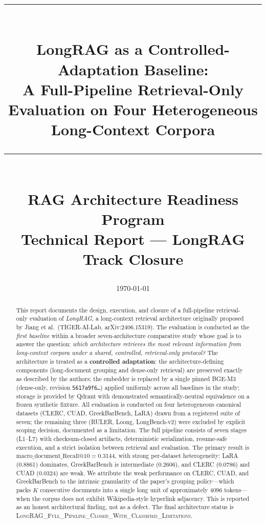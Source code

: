 \documentclass[11pt,a4paper]{article}
\title{
  \vspace{-1.5cm}
  \rule{\linewidth}{0.4pt}\\[0.3cm]
  {\Large\bfseries LongRAG as a Controlled-Adaptation Baseline:}\\[0.15cm]
  {\large A Full-Pipeline Retrieval-Only Evaluation on Four Heterogeneous\\ Long-Context Corpora}\\[0.2cm]
  \rule{\linewidth}{0.4pt}\\[0.4cm]
  \normalsize RAG Architecture Readiness Program\\
  \small Technical Report --- LongRAG Track Closure
}
\author{}
\date{\today}
\begin{document}
\maketitle
\thispagestyle{empty}

\begin{abstract}
\noindent
This report documents the design, execution, and closure of a
full-pipeline retrieval-only evaluation of \emph{LongRAG}, a
long-context retrieval architecture originally proposed by
Jiang et al.\ (TIGER-AI-Lab, arXiv:2406.15319). The evaluation is
conducted as the \emph{first baseline} within a broader
seven-architecture comparative study whose goal is to answer the
question: \emph{which architecture retrieves the most relevant
information from long-context corpora under a shared, controlled,
retrieval-only protocol?} The architecture is treated as a
\textbf{controlled adaptation}: the architecture-defining components
(long-document grouping and dense-only retrieval) are preserved
exactly as described by the authors; the embedder is replaced by a
single pinned BGE-M3 (dense-only, revision
\texttt{5617a9f6\dots}) applied uniformly across all baselines in the
study; storage is provided by Qdrant with demonstrated
semantically-neutral equivalence on a frozen synthetic fixture. All
evaluation is conducted on four heterogeneous canonical datasets
(CLERC, CUAD, GreekBarBench, LaRA) drawn from a registered suite of
seven; the remaining three (RULER, Loong, LongBench-v2) were excluded
by explicit scoping decision, documented as a limitation. The
full pipeline consists of seven stages (L1--L7) with checksum-closed
artifacts, deterministic serialization, resume-safe execution, and a
strict isolation between retrieval and evaluation.
The primary result is
$\mathrm{macro\_document\_Recall@10} = \num{0.3144}$,
with strong per-dataset heterogeneity: LaRA (\num{0.8861}) dominates,
GreekBarBench is intermediate (\num{0.2606}), and CLERC
(\num{0.0786}) and CUAD (\num{0.0324}) are weak. We attribute the
weak performance on CLERC, CUAD, and GreekBarBench to the intrinsic
granularity of the paper's grouping policy---which packs $K$
consecutive documents into a single long unit of approximately
\SI{4096}{} tokens---when the corpus does not exhibit Wikipedia-style
hyperlink adjacency. This is reported as an honest architectural
finding, not as a defect. The final architecture status is
\textsc{LongRAG\_Full\_Pipeline\_Closed\_With\_Classified\_Limitations}.
\end{abstract}
\end{document}
